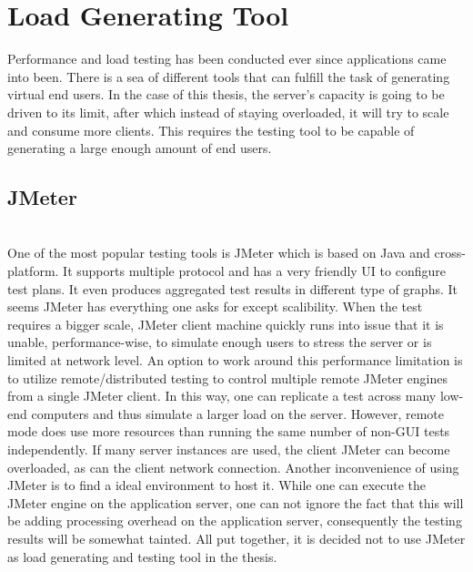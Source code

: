 \chapter{Load Generating Tool}
Performance and load testing has been conducted ever since applications came into been. There is a sea of different tools that can fulfill the task of generating virtual end users. In the case of this thesis, the server's capacity is going to be driven to its limit, after which instead of staying overloaded, it will try to scale and consume more clients. This requires the testing tool to be capable of generating a large enough amount of end users. 

\section{JMeter}
\\One of the most popular testing tools is JMeter which is based on Java and cross-platform. It supports multiple protocol and has a very friendly UI to configure test plans. It even produces aggregated test results in different type of graphs. It seems JMeter has everything one asks for except scalibility. When the test requires a bigger scale, JMeter client machine quickly runs into issue that it is unable, performance-wise, to simulate enough users to stress the server or is limited at network level. An option to work around this performance limitation is to utilize remote/distributed testing \citep{JMeterRemote} to control multiple remote JMeter engines from a single JMeter client. In this way, one can replicate a test across many low-end computers and thus simulate a larger load on the server. However, remote mode does use more resources than running the same number of non-GUI tests independently. If many server instances are used, the client JMeter can become overloaded, as can the client network connection. Another inconvenience of using JMeter is to find a ideal environment to host it. While one can execute the JMeter engine on the application server, one can not ignore the fact that this will be adding processing overhead on the application server, consequently  the testing results will be somewhat tainted. All put together, it is decided not to use JMeter as load generating and testing tool in the thesis. \\

